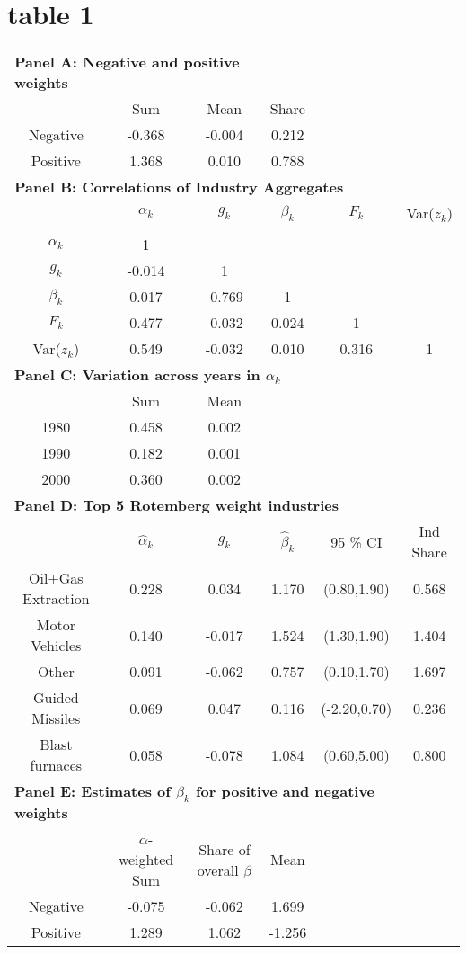 \documentclass{article}
\begin{document}
\section{table 1}
\begin{tabular}{cccccc}
\toprule
\multicolumn{3}{l}{\textbf{Panel A: Negative and positive weights}}\\
 & Sum & Mean & Share \\  \cmidrule(lr){2-4}
Negative & -0.368 & -0.004 & 0.212 \\
Positive & 1.368 & 0.010 & 0.788 \\
\multicolumn{5}{l}{\textbf{Panel B: Correlations of Industry Aggregates} }\\
 &$\alpha_k$ & $g_{k}$ & $\beta_k$ & $F_{k}$ & Var($z_k$) \\
\cmidrule(lr){2-6} 
 & \\
 $\alpha_k$             & 1\\
 $g_{k}$                &   -0.014  & 1\\
 $\beta_{k}$             &   0.017  & -0.769    &1\\
 $F_{k}$                &   0.477  & -0.032    &  0.024  & 1\\
 Var($z_{k}$)           &   0.549  & -0.032    &  0.010  &  0.316   &1\\
\multicolumn{5}{l}{\textbf{Panel C: Variation across years in $\alpha_{k}$}}\\
 & Sum & Mean \\  \cmidrule(lr){2-3}
1980 & 0.458 & 0.002 \\
1990 & 0.182 & 0.001 \\
2000 & 0.360 & 0.002 \\
\multicolumn{5}{l}{\textbf{Panel D: Top 5 Rotemberg weight industries} }\\
 & $\hat{\alpha}_{k}$ & $g_{k}$ & $\hat{\beta}_{k}$ & 95 \% CI & Ind Share \\ \cmidrule(lr){2-6}
Oil+Gas Extraction & 0.228 & 0.034 & 1.170 & (0.80,1.90)  & 0.568 \\ 
Motor Vehicles & 0.140 & -0.017 & 1.524 & (1.30,1.90)  & 1.404 \\ 
Other & 0.091 & -0.062 & 0.757 & (0.10,1.70)  & 1.697 \\ 
Guided Missiles & 0.069 & 0.047 & 0.116 & (-2.20,0.70)  & 0.236 \\ 
Blast furnaces & 0.058 & -0.078 & 1.084 & (0.60,5.00)  & 0.800 \\ 
\multicolumn{5}{l}{\textbf{Panel E: Estimates of $\beta_{k}$ for positive and negative weights} }\\
 & $\alpha$-weighted Sum & Share of overall $\beta$ & Mean  \\ \cmidrule(lr){2-3}
 Negative & -0.075 & -0.062 &1.699 \\
 Positive & 1.289 & 1.062 & -1.256 \\
\bottomrule
\end{tabular}
\end{document}
